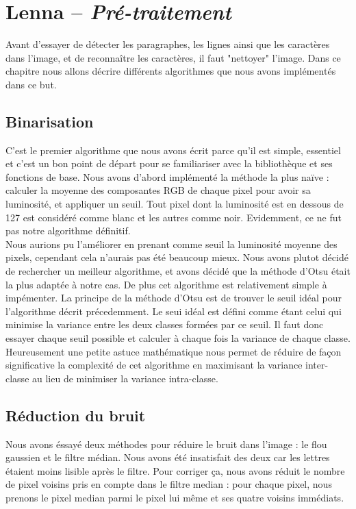 \chapter{Lenna -- \emph{Pré-traitement}}
Avant d'essayer de détecter les paragraphes, les lignes ainsi que les caractères dans l'image, et de reconnaître les caractères, il faut "nettoyer" l'image. Dans ce chapitre nous allons décrire différents algorithmes que nous avons implémentés dans ce but.\\

\section{Binarisation}
C'est le premier algorithme que nous avons écrit parce qu'il est simple, essentiel et c'est un bon point de départ pour se familiariser avec la bibliothèque et ses fonctions de base. Nous avons d'abord implémenté la méthode la plus naïve : calculer la moyenne des composantes RGB de chaque pixel pour avoir sa luminosité, et appliquer un seuil. Tout pixel dont la luminosité est en dessous de 127 est considéré comme blanc et les autres comme noir. Evidemment, ce ne fut pas notre algorithme définitif.\\

Nous aurions pu l'améliorer en prenant comme seuil la luminosité moyenne des pixels, cependant cela n'aurais pas été beaucoup mieux. Nous avons plutot décidé de rechercher un meilleur algorithme, et avons décidé que la méthode d'Otsu était la plus adaptée à notre cas. De plus cet algorithme est relativement simple à impémenter. La principe de la méthode d'Otsu est de trouver le seuil idéal pour l'algorithme décrit précedemment. Le seui idéal est défini comme étant celui qui minimise la variance entre les deux classes formées par ce seuil. Il faut donc essayer chaque seuil possible et calculer à chaque fois la variance de chaque classe. Heureusement une petite astuce mathématique nous permet de réduire de façon significative la complexité de cet algorithme en maximisant la variance inter-classe au lieu de minimiser la variance intra-classe.\\

\section{Réduction du bruit}

Nous avons éssayé deux méthodes pour réduire le bruit dans l'image : le flou gaussien et le filtre médian. Nous avons été insatisfait des deux car les lettres étaient moins lisible après le filtre. Pour corriger ça, nous avons réduit le nombre de pixel voisins pris en compte dans le filtre median : pour chaque pixel, nous prenons le pixel median parmi le pixel lui même et ses quatre voisins immédiats.\\

